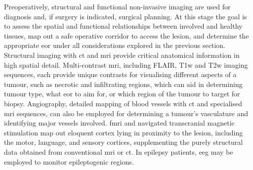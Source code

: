 Preoperatively, structural and functional non-invasive imaging are used for diagnosis and, if surgery is indicated, surgical planning.
At this stage the goal is to assess the spatial and functional relationships between involved and healthy tissues, map out a safe operative corridor to access the lesion, and determine the appropriate \gls{eor} under all considerations explored in the previous section.
Structural imaging with \gls{ct} and \gls{mri} provide critical anatomical information in high spatial detail.
Multi-contrast \gls{mri},  including FLAIR, T1w and T2w imaging sequences, each provide unique contrasts for visualising different aspects of a tumour, such as necrotic and infiltrating regions, which can aid in determining tumour type, what \gls{eor} to aim for, or which region of the tumour to target for biopsy.
Angiography, detailed mapping of blood vessels with \gls{ct} and specialised \gls{mri} sequences, can also be employed for determining a tumour's vasculature and identifying major vessels involved\autocite{Kashimura2008,Kim2019}.
\Gls{fmri} and navigated transcranial magnetic stimulation \autocite{WeissLucas2020} map out eloquent cortex lying in proximity to the lesion, including the motor, language, and sensory cortices, supplementing the purely structural data obtained from conventional \gls{mri} or \gls{ct}.
In epilepsy patients, \gls{eeg} may be employed to monitor epileptogenic regions\autocite{Sarco2006}.

